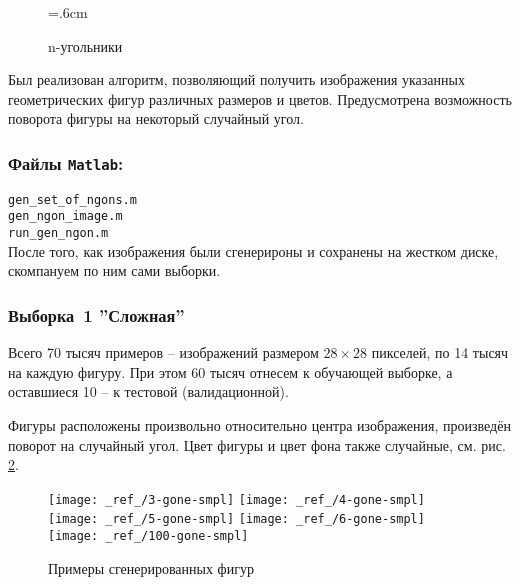 \documentclass[12pt,a4paper]{article}
\begin{document}
\begin{figure}[tbh!]
	\center
	\newdimen\R
	\R=.6cm
	\caption{n-угольники}
	\label{fig:04}
\end{figure}



Был реализован алгоритм, позволяющий получить изображения указанных геометрических фигур различных размеров и цветов. Предусмотрена возможность поворота фигуры на некоторый случайный угол.

\subsubsection*{Файлы \texttt{Matlab}:}
\verb|gen_set_of_ngons.m|\\
\verb|gen_ngon_image.m|\\
\verb|run_gen_ngon.m|\\[6pt]

После того, как изображения были сгенерироны и сохранены на жестком диске, скомпануем по ним сами выборки.

\subsubsection*{Выборка \textnumero\,1 ''Сложная''}
Всего 70 тысяч примеров -- изображений размером $28\times28$ пикселей, 
по 14 тысяч на каждую фигуру. При этом 60 тысяч отнесем к обучающей выборке, а оставшиеся 10 -- к тестовой (валидационной).

Фигуры расположены произвольно относительно центра изображения, произведён поворот на случайный угол. Цвет фигуры и цвет фона также случайные, см. рис.\,\ref{fig:05}.

\begin{figure}[H]
	\centering
	\texttt{[image: \_ref\_/3-gone-smpl]}	
	\texttt{[image: \_ref\_/4-gone-smpl]}
	\texttt{[image: \_ref\_/5-gone-smpl]}	
	\texttt{[image: \_ref\_/6-gone-smpl]}	
	\texttt{[image: \_ref\_/100-gone-smpl]}						
	\caption{Примеры сгенерированных фигур}
	\label{fig:05}
\end{figure}
\end{document}
